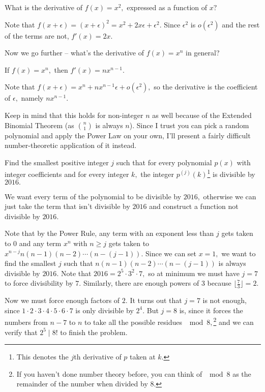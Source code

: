 \documentclass[blue,onecol]{shooting}
\begin{document}
\begin{exam}
What is the derivative of $f(x)=x^2,$ expressed as a function of $x?$
\end{exam}

\begin{sol}
Note that $f(x+\epsilon)=(x+\epsilon)^2=x^2+2x\epsilon+\epsilon^2.$ Since $\epsilon^2$ is $o(\epsilon^2)$ and the rest of the terms are not, $f'(x)=2x.$
\end{sol}

Now we go further -- what's the derivative of $f(x)=x^n$ in general?

\begin{theo}
If $f(x)=x^n,$ then $f'(x)=nx^{n-1}.$
\end{theo}

\begin{pro}
Note that $f(x+\epsilon)=x^n+nx^{n-1}\epsilon+o(\epsilon^2),$ so the derivative is the coefficient of $\epsilon,$ namely $nx^{n-1}.$
\end{pro}

Keep in mind that this holds for non-integer $n$ as well because of the Extended Binomial Theorem (as $\binom{n}{1}$ is always $n$). Since I trust you can pick a random polynomial and apply the Power Law on your own, I'll present a fairly difficult number-theoretic application of it instead.

\begin{exam}[Putnam 2016/A1]
Find the smallest positive integer $j$ such that for every polynomial $p(x)$ with integer coefficients and for every integer $k,$ the integer $p^{(j)}(k)$\footnote{This denotes the $j$th derivative of $p$ taken at $k.$} is divisible by $2016.$
\end{exam}

\begin{sol}
We want every term of the polynomial to be divisible by $2016,$ otherwise we can just take the term that isn't divisible by $2016$ and construct a function not divisible by $2016.$

Note that by the Power Rule, any term with an exponent less than $j$ gets taken to $0$ and any term $x^n$ with $n\geq j$ gets taken to $x^{n-j}n(n-1)(n-2)\cdots (n-(j-1)).$ Since we can set $x=1,$ we want to find the smallest $j$ such that $n(n-1)(n-2)\cdots(n-(j-1))$ is always divisible by $2016.$ Note that $2016=2^5\cdot 3^2\cdot 7,$ so at minimum we must have $j=7$ to force divisibility by $7$. Similarly, there are enough powers of $3$ because $\lfloor\frac{7}{3}\rfloor=2.$

Now we must force enough factors of $2.$ It turns out that $j=7$ is not enough, since $1\cdot 2\cdot 3\cdot 4\cdot 5\cdot 6\cdot 7$ is only divisible by $2^4.$ But $j=8$ is, since it forces the numbers from $n-7$ to $n$ to take all the possible residues $\mod 8,$\footnote{If you haven't done number theory before, you can think of $\mod 8$ as the remainder of the number when divided by $8.$} and we can verify that $2^5\mid 8!$ to finish the problem.
\end{sol}
\end{document}
